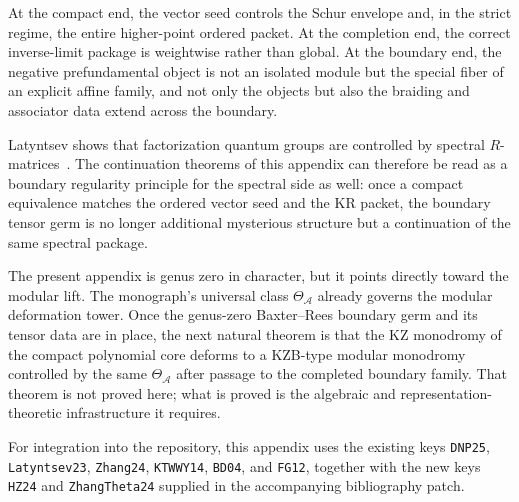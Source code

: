 At the compact end, the vector seed controls the Schur envelope and, in
the strict regime, the entire higher-point ordered packet.  At the
completion end, the correct inverse-limit package is weightwise rather
than global.  At the boundary end, the negative prefundamental object is
not an isolated module but the special fiber of an explicit affine family,
and not only the objects but also the braiding and associator data extend
across the boundary.

\begin{remark}
\label{rem:relation-factorization-quantum-groups}
Latyntsev shows that factorization quantum groups are controlled by
spectral $R$-matrices~\cite{Latyntsev23}.  The continuation theorems of
this appendix can therefore be read as a boundary regularity principle for
the spectral side as well: once a compact equivalence matches the ordered
vector seed and the KR packet, the boundary tensor germ is no longer
additional mysterious structure but a continuation of the same spectral
package.
\end{remark}

\begin{remark}
\label{rem:modular-lift-beyond-boundary}
The present appendix is genus zero in character, but it points directly
toward the modular lift.  The monograph's universal class
$\Theta_{\mathcal A}$ already governs the modular deformation tower.  Once
the genus-zero Baxter--Rees boundary germ and its tensor data are in
place, the next natural theorem is that the KZ monodromy of the compact
polynomial core deforms to a KZB-type modular monodromy controlled by the
same $\Theta_{\mathcal A}$ after passage to the completed boundary family.
That theorem is not proved here; what is proved is the algebraic and
representation-theoretic infrastructure it requires.
\end{remark}

\begin{remark}
\label{rem:bibliographic-note-typeA-baxter-rees}
For integration into the repository, this appendix uses the existing keys
\texttt{DNP25}, \texttt{Latyntsev23}, \texttt{Zhang24},
\texttt{KTWWY14}, \texttt{BD04}, and \texttt{FG12}, together with the new
keys \texttt{HZ24} and \texttt{ZhangTheta24} supplied in the accompanying
bibliography patch.
\end{remark}
